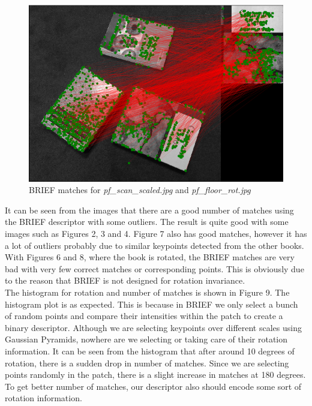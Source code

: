 \documentclass[a4paper]{article}
\begin{document}
\begin{figure}[!htb]
    \centering
    \includegraphics[width=\textwidth]{images/pf_floor_rot}
    \caption{BRIEF matches for \textit{pf\_scan\_scaled.jpg} and \textit{pf\_floor\_rot.jpg}}
\end{figure}

It can be seen from the images that there are a good number of matches using the BRIEF descriptor with some outliers. The result is quite good with some images such as Figures 2, 3 and 4. Figure 7 also has good matches, however it has a lot of outliers probably due to similar keypoints detected from the other books. With Figures 6 and 8, where the book is rotated, the BRIEF matches are very bad with very few correct matches or corresponding points. This is obviously due to the reason that BRIEF is not designed for rotation invariance.\\

The histogram for rotation and number of matches is shown in Figure 9. The histogram plot is as expected. This is because in BRIEF we only select a bunch of random points and compare their intensities within the patch to create a binary descriptor. Although we are selecting keypoints over different scales using Gaussian Pyramids, nowhere are we selecting or taking care of their rotation information. It can be seen from the histogram that after around 10 degrees of rotation, there is a sudden drop in number of matches. Since we are selecting points randomly in the patch, there is a slight increase in matches at 180 degrees. To get better number of matches, our descriptor also should encode some sort of rotation information.
\end{document}
